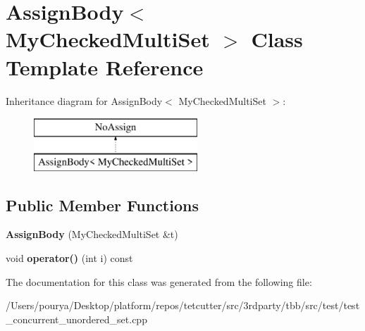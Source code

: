\hypertarget{classAssignBody_3_01MyCheckedMultiSet_01_4}{}\section{Assign\+Body$<$ My\+Checked\+Multi\+Set $>$ Class Template Reference}
\label{classAssignBody_3_01MyCheckedMultiSet_01_4}
Inheritance diagram for Assign\+Body$<$ My\+Checked\+Multi\+Set $>$\+:\begin{figure}[H]
\begin{center}
\leavevmode
\includegraphics[height=2.000000cm]{classAssignBody_3_01MyCheckedMultiSet_01_4}
\end{center}
\end{figure}
\subsection*{Public Member Functions}
\begin{DoxyCompactItemize}
\item 
\hypertarget{classAssignBody_3_01MyCheckedMultiSet_01_4_aeca14c97a3d217d542f98083eba7f2a6}{}{\bfseries Assign\+Body} (My\+Checked\+Multi\+Set \&t)\label{classAssignBody_3_01MyCheckedMultiSet_01_4_aeca14c97a3d217d542f98083eba7f2a6}

\item 
\hypertarget{classAssignBody_3_01MyCheckedMultiSet_01_4_ae31c0ed3766d71af0a1f0992be14fa8c}{}void {\bfseries operator()} (int i) const \label{classAssignBody_3_01MyCheckedMultiSet_01_4_ae31c0ed3766d71af0a1f0992be14fa8c}

\end{DoxyCompactItemize}


The documentation for this class was generated from the following file\+:\begin{DoxyCompactItemize}
\item 
/\+Users/pourya/\+Desktop/platform/repos/tetcutter/src/3rdparty/tbb/src/test/test\+\_\+concurrent\+\_\+unordered\+\_\+set.\+cpp\end{DoxyCompactItemize}
